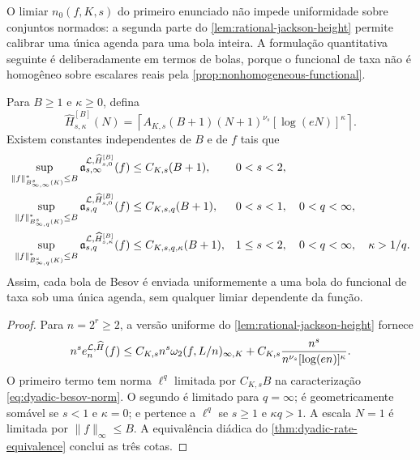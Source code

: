 O limiar $n_0(f,K,s)$ do primeiro enunciado não impede uniformidade sobre
conjuntos normados: a segunda parte do
\cref{lem:rational-jackson-height} permite calibrar uma única agenda para uma
bola inteira. A formulação quantitativa seguinte é deliberadamente em termos
de bolas, porque o funcional de taxa não é homogêneo sobre escalares reais
pela \cref{prop:nonhomogeneous-functional}.

\begin{corollary}
\label{cor:uniform-besov-ball-embedding}
Para $B\ge1$ e $\kappa\ge0$, defina
\begin{equation}
 \widehat H_{s,\kappa}^{[B]}(N)
 =\left\lceil A_{K,s}(B+1)(N+1)^{\nu_s}
        [\log(eN)]^\kappa\right\rceil .
 \label{eq:ball-calibrated-height-schedule}
\end{equation}
Existem constantes independentes de $B$ e de $f$ tais que
\begin{align}
 \sup_{\|f\|_{B^s_{\infty,\infty}(K)}^*\le B}
 \mathfrak a_{s,\infty}^{\mathcal{L},
       \widehat H_{s,0}^{[B]}}(f)
 &\le C_{K,s}(B+1), &&0<s<2,\label{eq:uniform-ball-endpoint}\\
 \sup_{\|f\|_{B^s_{\infty,q}(K)}^*\le B}
 \mathfrak a_{s,q}^{\mathcal{L},
       \widehat H_{s,0}^{[B]}}(f)
 &\le C_{K,s,q}(B+1), &&0<s<1,\quad0<q<\infty,
 \label{eq:uniform-ball-subcritical}\\
 \sup_{\|f\|_{B^s_{\infty,q}(K)}^*\le B}
 \mathfrak a_{s,q}^{\mathcal{L},
       \widehat H_{s,\kappa}^{[B]}}(f)
 &\le C_{K,s,q,\kappa}(B+1),
 &&1\le s<2,\quad0<q<\infty,\quad\kappa>1/q.
 \label{eq:uniform-ball-critical}
\end{align}
Assim, cada bola de Besov é enviada uniformemente a uma bola do funcional de
taxa sob uma única agenda, sem qualquer limiar dependente da função.
\end{corollary}

\begin{proof}
Para $n=2^r\ge2$, a versão uniforme do
\cref{lem:rational-jackson-height} fornece
\[
 n^s e_n^{\mathcal{L},\widehat H}(f)
 \le C_{K,s}n^s\omega_2(f,L/n)_{\infty,K}
 +C_{K,s}\frac{n^s}{n^{\nu_s}[\log(en)]^\kappa}.
\]
O primeiro termo tem norma $\ell^q$ limitada por $C_{K,s}B$ na
caracterização \eqref{eq:dyadic-besov-norm}. O segundo é limitado para
$q=\infty$; é geometricamente somável se $s<1$ e $\kappa=0$; e pertence a
$\ell^q$ se $s\ge1$ e $\kappa q>1$. A escala $N=1$ é limitada por
$\|f\|_\infty\le B$. A equivalência diádica do
\cref{thm:dyadic-rate-equivalence} conclui as três cotas.
\end{proof}

